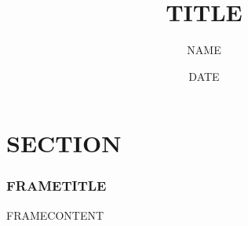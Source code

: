 \documentclass[mathserif]{beamer}
\title[SHORTTITLE]{TITLE}
\author{NAME}
\date{DATE}
\begin{document}
\frame{\titlepage}

\section{SECTION}

\begin{frame}\frametitle{FRAMETITLE}
	FRAMECONTENT
\end{frame}
\end{document}
